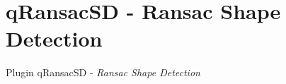 \section{qRansacSD - Ransac Shape Detection}
\label{subsection:qRansacSD}

Plugin qRansacSD - \emph{Ransac Shape Detection}
